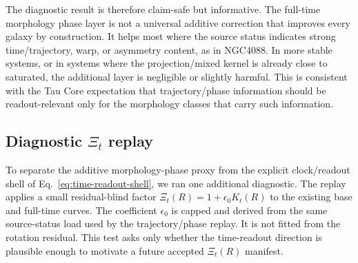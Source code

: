 \documentclass[11pt]{article}
\begin{document}
The diagnostic result is therefore claim-safe but informative.  The full-time
morphology phase layer is not a universal additive correction that improves
every galaxy by construction.  It helps most where the source status indicates
strong time/trajectory, warp, or asymmetry content, as in NGC4088.  In more
stable systems, or in systems where the projection/mixed kernel is already
close to saturated, the additional layer is negligible or slightly harmful.
This is consistent with the Tau Core expectation that trajectory/phase
information should be readout-relevant only for the morphology classes that
carry such information.

\subsection{Diagnostic \(\Xi_t\) replay}

To separate the additive morphology-phase proxy from the explicit clock/readout
shell of Eq.~\eqref{eq:time-readout-shell}, we ran one additional diagnostic.
The replay applies a small residual-blind factor
\(\Xi_t(R)=1+\epsilon_0 K_t(R)\) to the existing base and full-time curves.
The coefficient \(\epsilon_0\) is capped and derived from the same
source-status load used by the trajectory/phase replay.  It is not fitted from
the rotation residual.  This test asks only whether the time-readout direction
is plausible enough to motivate a future accepted \(\Xi_t(R)\) manifest.
\end{document}

